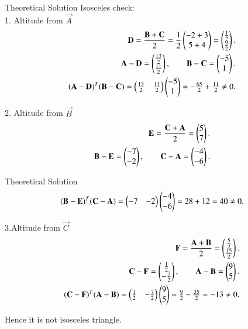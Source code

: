 \documentclass{beamer}
\begin{document}
\begin{frame}{Theoretical Solution}
Isosceles check:\\

1. Altitude from $\vec{A}$ 
\begin{align}
\mathbf{D}=\frac{\mathbf{B}+\mathbf{C}}{2}
=\frac{1}{2}\begin{pmatrix}-2+3\\5+4\end{pmatrix}
=\begin{pmatrix}\tfrac{1}{2}\\\tfrac{9}{2}\end{pmatrix}.\\
\mathbf{A}-\mathbf{D}
=\begin{pmatrix}\tfrac{13}{2}\\\tfrac{11}{2}\end{pmatrix},\qquad
\mathbf{B}-\mathbf{C}
=\begin{pmatrix}-5\\1\end{pmatrix}.\\
(\mathbf{A}-\mathbf{D})^{T}(\mathbf{B}-\mathbf{C})
=\begin{pmatrix}\tfrac{13}{2} & \tfrac{11}{2}\end{pmatrix}
\begin{pmatrix}-5\\1\end{pmatrix}
=-\tfrac{65}{2}+\tfrac{11}{2}\neq 0.
\end{align}


2. Altitude from $\vec{B}$
\begin{align}
\mathbf{E}=\frac{\mathbf{C}+\mathbf{A}}{2}
=\begin{pmatrix}5\\7\end{pmatrix}.\\
\mathbf{B}-\mathbf{E}=\begin{pmatrix}-7\\-2\end{pmatrix},\qquad
\mathbf{C}-\mathbf{A}=\begin{pmatrix}-4\\-6\end{pmatrix}.
\end{align}
\end{frame}
\begin{frame}{Theoretical Solution}
\begin{align}
(\mathbf{B}-\mathbf{E})^{T}(\mathbf{C}-\mathbf{A})
=\begin{pmatrix}-7 & -2\end{pmatrix}\begin{pmatrix}-4\\-6\end{pmatrix}
=28+12=40\neq 0.
\end{align}
 
3.Altitude from $\vec{C}$
\begin{align}
\mathbf{F}=\frac{\mathbf{A}+\mathbf{B}}{2}
=\begin{pmatrix}\tfrac{5}{2}\\\tfrac{15}{2}\end{pmatrix}.\\
\mathbf{C}-\mathbf{F}=\begin{pmatrix}\tfrac{1}{2}\\-\tfrac{7}{2}\end{pmatrix},\qquad
\mathbf{A}-\mathbf{B}=\begin{pmatrix}9\\5\end{pmatrix}.\\
(\mathbf{C}-\mathbf{F})^{T}(\mathbf{A}-\mathbf{B})
=\begin{pmatrix}\tfrac{1}{2} & -\tfrac{7}{2}\end{pmatrix}
\begin{pmatrix}9\\5\end{pmatrix}
=\tfrac{9}{2}-\tfrac{35}{2}=-13\neq0.
\end{align}
\begin{center}    
Hence it is not isosceles triangle.
\end{center}
\end{frame}
\end{document}
